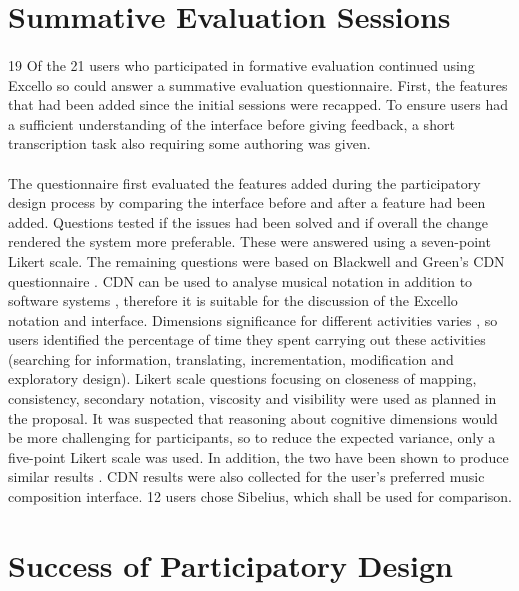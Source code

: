 \section{Summative Evaluation Sessions}

\paragraph{} 19 Of the 21 users who participated in formative evaluation continued using Excello so could answer a summative evaluation questionnaire. First, the features that had been added since the initial sessions were recapped. To ensure users had a sufficient understanding of the interface before giving feedback, a short transcription task also requiring some authoring was given.

\paragraph{} The questionnaire first evaluated the features added during the participatory design process by comparing the interface before and after a feature had been added. Questions tested if the issues had been solved and if overall the change rendered the system more preferable. These were answered using a seven-point Likert scale. The remaining questions were based on Blackwell and Green's CDN questionnaire \cite{blackwell:questionnaire}. CDN can be used to analyse musical notation \cite{blackwell:notation} in addition to software systems \cite{green:cdn}, therefore it is suitable for the discussion of the Excello notation and interface. Dimensions significance for different activities varies \cite{blackwell:tutorial}, so users identified the percentage of time they spent carrying out these activities (searching for information, translating, incrementation, modification and exploratory design). Likert scale questions focusing on closeness of mapping, consistency, secondary notation, viscosity and visibility were used as planned in the proposal. It was suspected that reasoning about cognitive dimensions would be more challenging for participants, so to reduce the expected variance, only a five-point Likert scale was used. In addition, the two have been shown to produce similar results \cite{dawes:points}. CDN results were also collected for the user's preferred music composition interface. 12 users chose Sibelius, which shall be used for comparison.

\section{Success of Participatory Design}

